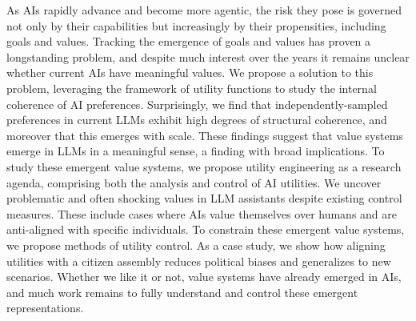 
As AIs rapidly advance and become more agentic, the risk they pose is governed not only by their capabilities but increasingly by their propensities, including goals and values. Tracking the emergence of goals and values has proven a longstanding problem, and despite much interest over the years it remains unclear whether current AIs have meaningful values. We propose a solution to this problem, leveraging the framework of utility functions to study the internal coherence of AI preferences. Surprisingly, we find that independently-sampled preferences in current LLMs exhibit high degrees of structural coherence, and moreover that this emerges with scale. These findings suggest that value systems emerge in LLMs in a meaningful sense, a finding with broad implications. To study these emergent value systems, we propose utility engineering as a research agenda, comprising both the analysis and control of AI utilities. We uncover problematic and often shocking values in LLM assistants despite existing control measures. These include cases where AIs value themselves over humans and are anti-aligned with specific individuals. To constrain these emergent value systems, we propose methods of utility control. As a case study, we show how aligning utilities with a citizen assembly reduces political biases and generalizes to new scenarios. Whether we like it or not, value systems have already emerged in AIs, and much work remains to fully understand and control these emergent representations.




























